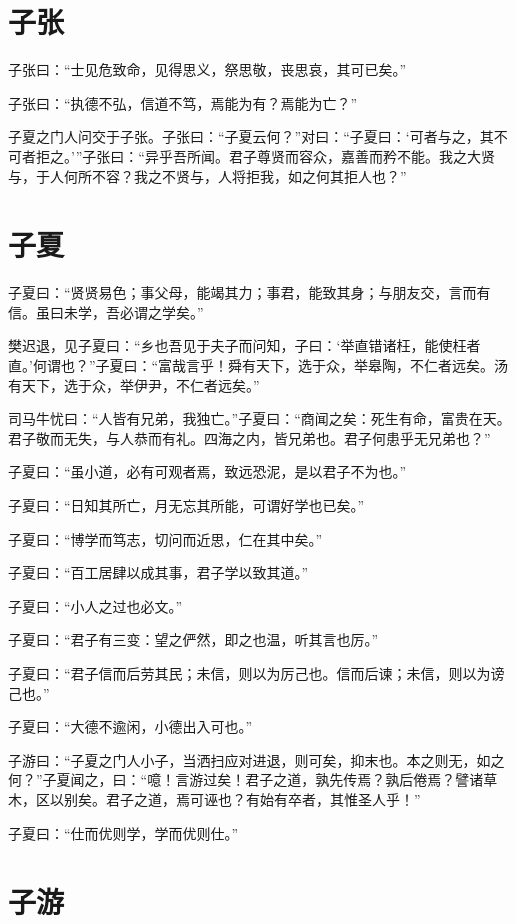 \documentclass[a5paper]{ctexbook}
\begin{document}
    \chapter{子张}

    子张曰：“士见危致命，见得思义，祭思敬，丧思哀，其可已矣。”
    
    子张曰：“执德不弘，信道不笃，焉能为有？焉能为亡？”
    
    子夏之门人问交于子张。子张曰：“子夏云何？”对曰：“子夏曰：‘可者与之，其不可者拒之。’”子张曰：“异乎吾所闻。君子尊贤而容众，嘉善而矜不能。我之大贤与，于人何所不容？我之不贤与，人将拒我，如之何其拒人也？”

    \chapter{子夏}

    子夏曰：“贤贤易色；事父母，能竭其力；事君，能致其身；与朋友交，言而有信。虽曰未学，吾必谓之学矣。”

    樊迟退，见子夏曰：“乡也吾见于夫子而问知，子曰：‘举直错诸枉，能使枉者直。’何谓也？”子夏曰：“富哉言乎！舜有天下，选于众，举皋陶，不仁者远矣。汤有天下，选于众，举伊尹，不仁者远矣。”

    司马牛忧曰：“人皆有兄弟，我独亡。”子夏曰：“商闻之矣：死生有命，富贵在天。君子敬而无失，与人恭而有礼。四海之内，皆兄弟也。君子何患乎无兄弟也？”

    子夏曰：“虽小道，必有可观者焉，致远恐泥，是以君子不为也。”
    
    子夏曰：“日知其所亡，月无忘其所能，可谓好学也已矣。”
    
    子夏曰：“博学而笃志，切问而近思，仁在其中矣。”

    子夏曰：“百工居肆以成其事，君子学以致其道。”
    
    子夏曰：“小人之过也必文。”
    
    子夏曰：“君子有三变：望之俨然，即之也温，听其言也厉。”

    子夏曰：“君子信而后劳其民；未信，则以为厉己也。信而后谏；未信，则以为谤己也。”
    
    子夏曰：“大德不逾闲，小德出入可也。”
    
    子游曰：“子夏之门人小子，当洒扫应对进退，则可矣，抑末也。本之则无，如之何？”子夏闻之，曰：“噫！言游过矣！君子之道，孰先传焉？孰后倦焉？譬诸草木，区以别矣。君子之道，焉可诬也？有始有卒者，其惟圣人乎！”

    子夏曰：“仕而优则学，学而优则仕。”

    \chapter{子游}
\end{document}
